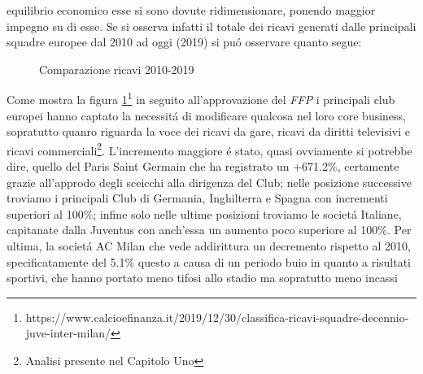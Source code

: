 \documentclass[
    corpo=12pt,
    oneside,
    evenboxes,
    tipotesi=triennale,
    stile=classica,
    oldstyle,
    autoretitolo,
    greek,
]{toptesi}
\begin{document}
\begin{interlinea}{1.5}
equilibrio economico esse si sono dovute ridimensionare, ponendo maggior impegno su di esse. Se si osserva infatti il totale dei ricavi
generati dalle principali squadre europee dal 2010 ad oggi (2019) si pu\'o osservare quanto segue:
\begin{figure}
    \centering
     \quad
    \caption{Comparazione ricavi 2010-2019}
    \label{comp_ricavi_10_19}  
\end{figure}
Come mostra la figura \ref{comp_ricavi_10_19}\footnote{https://www.calcioefinanza.it/2019/12/30/classifica-ricavi-squadre-decennio-juve-inter-milan/}
in seguito all'approvazione del \emph{FFP} i principali club europei hanno captato la necessit\'a di modificare qualcosa nel loro core business,
sopratutto quanro riguarda la voce dei ricavi da gare, ricavi da diritti televisivi e ricavi commerciali\footnote{Analisi presente nel Capitolo Uno}.
L'incremento maggiore \'e stato, quasi ovviamente si potrebbe dire, quello del Paris Saint Germain che ha registrato un +671.2\%, certamente
grazie all'approdo degli sceicchi alla dirigenza del Club; nelle posizione successive troviamo i principali Club di Germania, Inghilterra e Spagna
con incrementi superiori al 100\%; infine solo nelle ultime posizioni troviamo le societ\'a Italiane, capitanate dalla Juventus con anch'essa un aumento 
poco superiore al 100\%. Per ultima, la societ\'a AC Milan che vede addirittura un decremento rispetto al 2010, specificatamente del 5.1\%
questo a causa di un periodo buio in quanto a risultati sportivi, che hanno portato meno tifosi allo stadio ma sopratutto meno incassi 

\end{interlinea}
\end{document}
